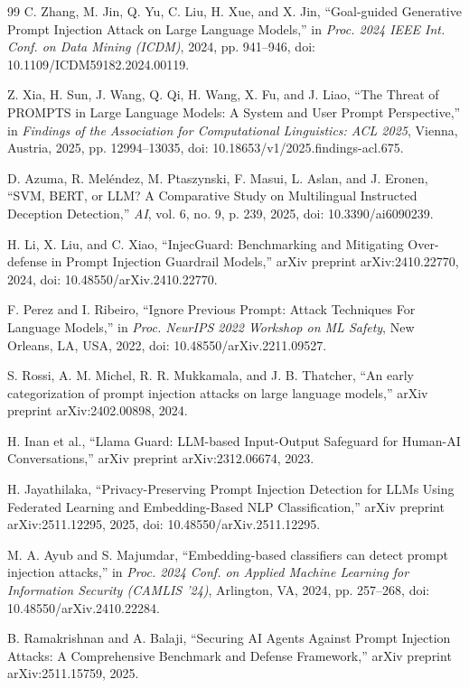 \documentclass[12pt, letterpaper]{article}   %
\begin{document}
\begin{thebibliography}{99}
C. Zhang, M. Jin, Q. Yu, C. Liu, H. Xue, and X. Jin, ``Goal-guided Generative Prompt Injection Attack on Large Language Models,'' in \textit{Proc. 2024 IEEE Int. Conf. on Data Mining (ICDM)}, 2024, pp. 941--946, doi: 10.1109/ICDM59182.2024.00119.

Z. Xia, H. Sun, J. Wang, Q. Qi, H. Wang, X. Fu, and J. Liao, ``The Threat of PROMPTS in Large Language Models: A System and User Prompt Perspective,'' in \textit{Findings of the Association for Computational Linguistics: ACL 2025}, Vienna, Austria, 2025, pp. 12994--13035, doi: 10.18653/v1/2025.findings-acl.675.

D. Azuma, R. Mel\'{e}ndez, M. Ptaszynski, F. Masui, L. Aslan, and J. Eronen, ``SVM, BERT, or LLM? A Comparative Study on Multilingual Instructed Deception Detection,'' \textit{AI}, vol. 6, no. 9, p. 239, 2025, doi: 10.3390/ai6090239.

H. Li, X. Liu, and C. Xiao, ``InjecGuard: Benchmarking and Mitigating Over-defense in Prompt Injection Guardrail Models,'' arXiv preprint arXiv:2410.22770, 2024, doi: 10.48550/arXiv.2410.22770.

F. Perez and I. Ribeiro, ``Ignore Previous Prompt: Attack Techniques For Language Models,'' in \textit{Proc. NeurIPS 2022 Workshop on ML Safety}, New Orleans, LA, USA, 2022, doi: 10.48550/arXiv.2211.09527.

S. Rossi, A. M. Michel, R. R. Mukkamala, and J. B. Thatcher, ``An early categorization of prompt injection attacks on large language models,'' arXiv preprint arXiv:2402.00898, 2024.

H. Inan et al., ``Llama Guard: LLM-based Input-Output Safeguard for Human-AI Conversations,'' arXiv preprint arXiv:2312.06674, 2023.

H. Jayathilaka, ``Privacy-Preserving Prompt Injection Detection for LLMs Using Federated Learning and Embedding-Based NLP Classification,'' arXiv preprint arXiv:2511.12295, 2025, doi: 10.48550/arXiv.2511.12295.

M. A. Ayub and S. Majumdar, ``Embedding-based classifiers can detect prompt injection attacks,'' in \textit{Proc. 2024 Conf. on Applied Machine Learning for Information Security (CAMLIS '24)}, Arlington, VA, 2024, pp. 257--268, doi: 10.48550/arXiv.2410.22284.

B. Ramakrishnan and A. Balaji, ``Securing AI Agents Against Prompt Injection Attacks: A Comprehensive Benchmark and Defense Framework,'' arXiv preprint arXiv:2511.15759, 2025.


\end{thebibliography}
\end{document}
